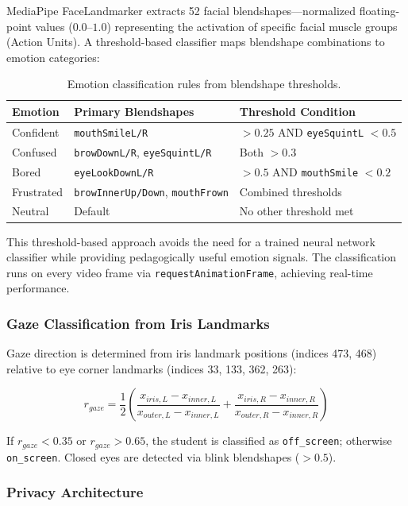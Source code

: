 \documentclass[conference, letterpaper]{IEEEtran}
\begin{document}
MediaPipe FaceLandmarker extracts 52 facial blendshapes---normalized floating-point values ($0.0$--$1.0$) representing the activation of specific facial muscle groups (Action Units). A threshold-based classifier maps blendshape combinations to emotion categories:

\begin{table}[!t]
\centering
\caption{Emotion classification rules from blendshape thresholds.}
\label{tab:emotion}
\small
\begin{tabular}{@{}lll@{}}
\toprule
\textbf{Emotion} & \textbf{Primary Blendshapes} & \textbf{Threshold Condition} \\
\midrule
Confident & \texttt{mouthSmileL/R} & $> 0.25$ AND \texttt{eyeSquintL} $< 0.5$ \\
Confused & \texttt{browDownL/R}, \texttt{eyeSquintL/R} & Both $> 0.3$ \\
Bored & \texttt{eyeLookDownL/R} & $> 0.5$ AND \texttt{mouthSmile} $< 0.2$ \\
Frustrated & \texttt{browInnerUp/Down}, \texttt{mouthFrown} & Combined thresholds \\
Neutral & Default & No other threshold met \\
\bottomrule
\end{tabular}
\end{table}

This threshold-based approach avoids the need for a trained neural network classifier while providing pedagogically useful emotion signals. The classification runs on every video frame via \texttt{requestAnimationFrame}, achieving real-time performance.

\subsubsection{Gaze Classification from Iris Landmarks}

Gaze direction is determined from iris landmark positions (indices 473, 468) relative to eye corner landmarks (indices 33, 133, 362, 263):

\[
r_{gaze} = \frac{1}{2}\left(\frac{x_{iris,L} - x_{inner,L}}{x_{outer,L} - x_{inner,L}} + \frac{x_{iris,R} - x_{inner,R}}{x_{outer,R} - x_{inner,R}}\right)
\]

If $r_{gaze} < 0.35$ or $r_{gaze} > 0.65$, the student is classified as \texttt{off\_screen}; otherwise \texttt{on\_screen}. Closed eyes are detected via blink blendshapes ($> 0.5$).

\subsubsection{Privacy Architecture}
\end{document}
